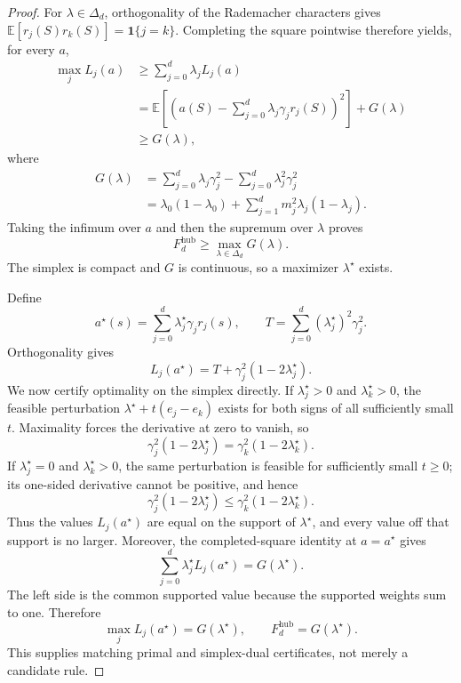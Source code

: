 \documentclass{article}
\begin{document}
\begin{proof}
For \(\lambda\in\Delta_d\), orthogonality of the Rademacher characters gives \(\mathbb E[r_j(S)r_k(S)]=\mathbf 1\{j=k\}\).  Completing the square pointwise therefore yields, for every \(a\),
\[
\begin{aligned}
 \max_jL_j(a)
 &\geq\sum_{j=0}^d\lambda_jL_j(a)\\
 &=\mathbb E\!\left[
 \left(a(S)-\sum_{j=0}^d\lambda_j\gamma_jr_j(S)\right)^2
 \right]+G(\lambda)\\
 &\geq G(\lambda),
\end{aligned}
\]
where
\[
\begin{aligned}
 G(\lambda)
 &=\sum_{j=0}^d\lambda_j\gamma_j^2
   -\sum_{j=0}^d\lambda_j^2\gamma_j^2\\
 &=\lambda_0(1-\lambda_0)
   +\sum_{j=1}^dm_j^2\lambda_j(1-\lambda_j).
\end{aligned}
\]
Taking the infimum over \(a\) and then the supremum over \(\lambda\) proves
\[
 F_d^{\mathrm{hub}}\geq\max_{\lambda\in\Delta_d}G(\lambda).
\]
The simplex is compact and \(G\) is continuous, so a maximizer \(\lambda^{\star}\) exists.

Define
\[
 a^{\star}(s)=\sum_{j=0}^d\lambda_j^{\star}\gamma_jr_j(s),
 \qquad
 T=\sum_{j=0}^d(\lambda_j^{\star})^2\gamma_j^2.
\]
Orthogonality gives
\[
 L_j(a^{\star})=T+\gamma_j^2(1-2\lambda_j^{\star}).
\]
We now certify optimality on the simplex directly.  If \(\lambda_j^{\star}>0\) and \(\lambda_k^{\star}>0\), the feasible perturbation \(\lambda^{\star}+t(e_j-e_k)\) exists for both signs of all sufficiently small \(t\).  Maximality forces the derivative at zero to vanish, so
\[
 \gamma_j^2(1-2\lambda_j^{\star})
 =\gamma_k^2(1-2\lambda_k^{\star}).
\]
If \(\lambda_j^{\star}=0\) and \(\lambda_k^{\star}>0\), the same perturbation is feasible for sufficiently small \(t\geq0\); its one-sided derivative cannot be positive, and hence
\[
 \gamma_j^2(1-2\lambda_j^{\star})
 \leq\gamma_k^2(1-2\lambda_k^{\star}).
\]
Thus the values \(L_j(a^{\star})\) are equal on the support of \(\lambda^{\star}\), and every value off that support is no larger.  Moreover, the completed-square identity at \(a=a^{\star}\) gives
\[
 \sum_{j=0}^d\lambda_j^{\star}L_j(a^{\star})=G(\lambda^{\star}).
\]
The left side is the common supported value because the supported weights sum to one.  Therefore
\[
 \max_jL_j(a^{\star})=G(\lambda^{\star}),
 \qquad
 F_d^{\mathrm{hub}}=G(\lambda^{\star}).
\]
This supplies matching primal and simplex-dual certificates, not merely a candidate rule.


\end{proof}
\end{document}
